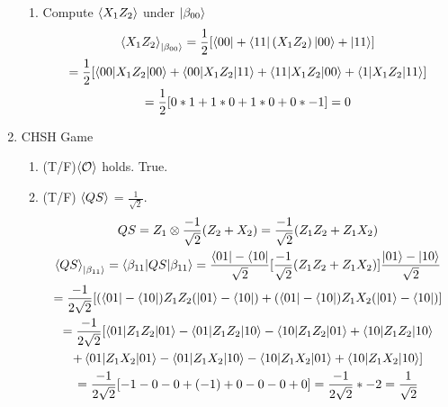\documentclass[]{article}
\begin{document}
\begin{enumerate}
\begin{enumerate}
        \item Compute $\braket{X_1Z_2}$ under $\ket{\beta_{00}}$
          \begin{gather*}
            \braket{X_1 Z_2}_{\ket{\beta_{00}}} = \frac{1}{2}[\bra{00} + \bra{11}(X_1 Z_2) \ket{00} + \ket{11}]\\
            = \frac{1}{2}[\braket{00|X_1 Z_2|00} + \braket{00|X_1 Z_2|11}
            + \braket{11|X_1 Z_2|00} + \braket{1|X_1 Z_2|11}]\\
            = \frac{1}{2}[0*1 + 1*0 + 1*0 + 0*-1] = 0
          \end{gather*}
      \end{enumerate}
    \item CHSH Game

      \begin{enumerate}
        \item (T/F)$\braket{\mathcal O}$ holds. True.
        \item (T/F) $\braket{QS}$ = $\frac{1}{\sqrt{2}}$.
          \begin{gather*}
            QS = Z_1 \otimes \frac{-1}{\sqrt{2}}(Z_2 + X_2) = \frac{-1}{\sqrt{2}}(Z_1 Z_2 + Z_1 X_2)\\
            \braket{QS}_{\ket{\beta_{11}}} = \braket{\beta_{11} | QS | \beta_{11}}
            = \frac{\bra{01} - \bra{10}}{\sqrt{2}}[\frac{-1}{\sqrt{2}}(Z_1 Z_2 + Z_1 X_2)]
            \frac{\ket{01} - \ket{10}}{\sqrt{2}}\\
            = \frac{-1}{2\sqrt{2}}[(\bra{01} - \bra{10})Z_1 Z_2(\ket{01} - \bra{10}) + 
            (\bra{01} - \bra{10})Z_1 X_2(\ket{01} - \bra{10})]\\
            = \frac{-1}{2\sqrt{2}}[
            \braket{01|Z_1 Z_2|01} - \braket{01|Z_1 Z_2|10} - \braket{10|Z_1 Z_2|01} + \braket{10|Z_1 Z_2|10}\\
            + \braket{01|Z_1 X_2|01} - \braket{01|Z_1 X_2|10} - \braket{10|Z_1 X_2|01} + \braket{10|Z_1 X_2|10}]\\
            = \frac{-1}{2\sqrt{2}}[-1 -0 -0 + (-1) + 0-0-0+0] = \frac{-1}{2\sqrt{2}}*-2 = \frac{1}{\sqrt{2}}
          \end{gather*}
          

\end{enumerate}
\end{enumerate}
\end{document}
